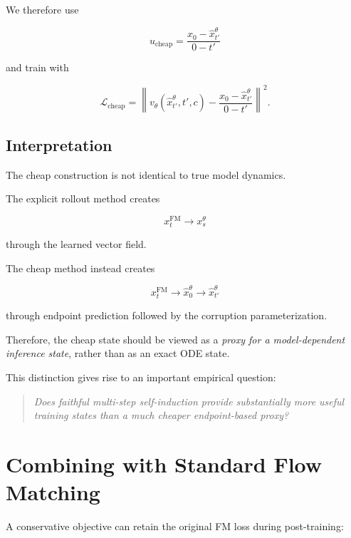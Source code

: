 \documentclass[11pt]{article}
\begin{document}
We therefore use

\begin{equation}
u_{\mathrm{cheap}}
=
\frac{x_0-\hat{x}_{t'}^\theta}{0-t'}
\end{equation}

and train with

\begin{equation}
\boxed{
\mathcal{L}_{\mathrm{cheap}}
=
\left\|
v_\theta(\hat{x}_{t'}^\theta,t',c)
-
\frac{x_0-\hat{x}_{t'}^\theta}{0-t'}
\right\|^2.
}
\end{equation}

\subsection{Interpretation}

The cheap construction is not identical to true model dynamics.

The explicit rollout method creates

\begin{equation}
x_t^{\mathrm{FM}}
\rightarrow
x_s^\theta
\end{equation}

through the learned vector field.

The cheap method instead creates

\begin{equation}
x_t^{\mathrm{FM}}
\rightarrow
\hat{x}_0^\theta
\rightarrow
\hat{x}_{t'}^\theta
\end{equation}

through endpoint prediction followed by the corruption parameterization.

Therefore, the cheap state should be viewed as a \emph{proxy for a
model-dependent inference state}, rather than as an exact ODE state.

This distinction gives rise to an important empirical question:

\begin{quote}
\emph{Does faithful multi-step self-induction provide substantially more useful
training states than a much cheaper endpoint-based proxy?}
\end{quote}

\section{Combining with Standard Flow Matching}

A conservative objective can retain the original FM loss during post-training:
\end{document}

